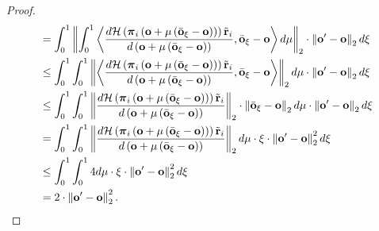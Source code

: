\documentclass[10pt]{article}
\def\rvo{{\mathbf{o}}}
\def\rvo{{\mathbf{o}}}
\def\rvtilder{{\tilde{\mathbf{r}}}}
\def\rvpi{{\boldsymbol{\pi}}}
\def\gH{{\mathcal{H}}}
\begin{document}
\begin{proof}
\begin{equation*}
\begin{split}
    &= \int_0^1{ \left\| \int_0^1{\left\langle \frac{d \gH \left( \rvpi_i\left( \rvo + \mu\left( \bar{\rvo}_\xi - \rvo \right) \right) \right) \rvtilder_i }{d \left( \rvo + \mu\left( \bar{\rvo}_\xi - \rvo \right) \right)}, \bar{\rvo}_\xi - \rvo \right\rangle d\mu} \right\|_2 \cdot \left\| \rvo^\prime - \rvo \right\|_2 d\xi} \\
    &\le \int_0^1{  \int_0^1{ \left\| \left\langle \frac{d \gH \left( \rvpi_i\left( \rvo + \mu\left( \bar{\rvo}_\xi - \rvo \right) \right) \right) \rvtilder_i }{d \left( \rvo + \mu\left( \bar{\rvo}_\xi - \rvo \right) \right)}, \bar{\rvo}_\xi - \rvo \right\rangle \right\|_2 d\mu} \cdot \left\| \rvo^\prime - \rvo \right\|_2 d\xi} \\
    &\le \int_0^1{  \int_0^1{ \left\| \frac{d \gH \left( \rvpi_i\left( \rvo + \mu\left( \bar{\rvo}_\xi - \rvo \right) \right) \right) \rvtilder_i }{d \left( \rvo + \mu\left( \bar{\rvo}_\xi - \rvo \right) \right)} \right\|_2 \cdot \left\| \bar{\rvo}_\xi - \rvo \right\|_2 d\mu} \cdot \left\| \rvo^\prime - \rvo \right\|_2 d\xi} \\
    &= \int_0^1{  \int_0^1{ \left\| \frac{d \gH \left( \rvpi_i\left( \rvo + \mu\left( \bar{\rvo}_\xi - \rvo \right) \right) \right) \rvtilder_i }{d \left( \rvo + \mu\left( \bar{\rvo}_\xi - \rvo \right) \right)} \right\|_2 d\mu} \cdot \xi \cdot \left\| \rvo^\prime - \rvo \right\|_2^2 d\xi} \\
    &\le \int_0^1{  \int_0^1{ 4 d\mu} \cdot \xi \cdot \left\| \rvo^\prime - \rvo \right\|_2^2 d\xi} \\
    &= 2 \cdot \left\| \rvo^\prime - \rvo \right\|_2^2. \qedhere
\end{split}
\end{equation*}
\end{proof}
\end{document}
